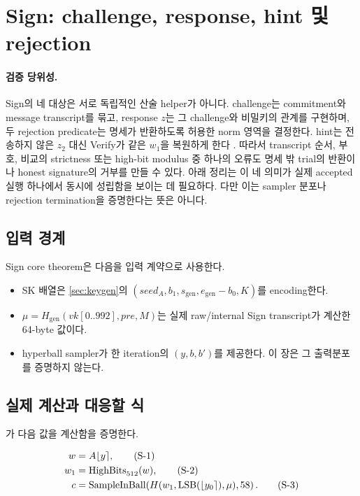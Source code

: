 \section{Sign: challenge, response, hint 및 rejection}
\label{sec:sign}

\paragraph{검증 당위성.}
Sign의 네 대상은 서로 독립적인 산술 helper가 아니다. challenge는 commitment와
message transcript를 묶고, response \(z\)는 그 challenge와 비밀키의 관계를
구현하며, 두 rejection predicate는 명세가 반환하도록 허용한 norm 영역을
결정한다. hint는 전송하지 않은 \(z_2\) 대신 Verify가 같은 \(w_1\)을 복원하게
한다 \cite{haetae-spec}. 따라서 transcript 순서, 부호, 비교의 strictness 또는
high-bit modulus 중 하나의 오류도 명세 밖 trial의 반환이나 honest signature의
거부를 만들 수 있다. 아래 정리는 이 네 의미가 실제 accepted 실행 하나에서
동시에 성립함을 보이는 데 필요하다. 다만 이는 sampler 분포나 rejection
termination을 증명한다는 뜻은 아니다.

\subsection{입력 경계}

Sign core theorem은 다음을 입력 계약으로 사용한다.

\begin{itemize}
  \item SK 배열은 \cref{sec:keygen}의
        \((seed_A,b_1,s_{\mathrm{gen}},e_{\mathrm{gen}}-b_0,K)\)를 encoding한다.
  \item \(\mu=H_{\mathrm{gen}}(vk[0..992],pre,M)\)는 실제 raw/internal Sign
        transcript가 계산한 64-byte 값이다.
  \item hyperball sampler가 한 iteration의 \((y,b,b')\)를 제공한다.
        이 장은 그 출력분포를 증명하지 않는다.
\end{itemize}

\subsection{실제 계산과 대응할 식}

가 다음 값을 계산함을 증명한다.

\begin{align}
w &= A\lfloor y\rceil, \tag{S-1}\\
w_1 &= \operatorname{HighBits}_{512}(w), \tag{S-2}\\
c &= \operatorname{SampleInBall}\!\left(
 H(w_1,\operatorname{LSB}(\lfloor y_0\rceil),\mu),58
 \right). \tag{S-3}
\end{align}

